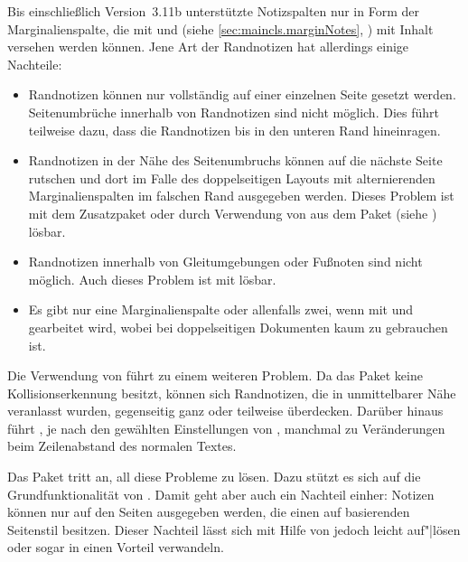 \BeginIndexGroup
{}%
Bis einschließlich Version~3.11b unterstützte \KOMAScript{} Notizspalten nur
in Form der Marginalienspalte, die mit  und
 (siehe \autoref{sec:maincls.marginNotes},
) mit Inhalt versehen werden
können. Jene Art der Randnotizen hat allerdings einige Nachteile:
\begin{itemize}
\item Randnotizen können nur vollständig auf einer einzelnen Seite gesetzt
  werden. Seitenumbrüche innerhalb von Randnotizen
  sind nicht möglich. Dies führt teilweise dazu, dass die Randnotizen bis in
  den unteren Rand hineinragen.
\item Randnotizen in der Nähe des Seitenumbruchs können auf die nächste Seite
  rutschen und dort im Falle des doppelseitigen Layouts mit alternierenden
  Marginalienspalten im falschen Rand
  ausgegeben werden. Dieses Problem ist mit dem Zusatzpaket
   oder durch Verwendung von
   aus dem Paket
   (siehe
  \cite{package:marginnote}) lösbar.
\item Randnotizen innerhalb von Gleitumgebungen oder
  Fußnoten sind nicht möglich. Auch dieses Problem ist mit
   lösbar.
\item Es gibt nur eine Marginalienspalte oder
  allenfalls zwei, wenn mit  und
   gearbeitet wird, wobei  bei
  doppelseitigen Dokumenten kaum zu gebrauchen ist.
\end{itemize}
Die Verwendung von  führt zu
einem weiteren Problem. Da das Paket keine Kollisionserkennung besitzt, können
sich Randnotizen, die in unmittelbarer Nähe veranlasst wurden, gegenseitig
ganz oder teilweise überdecken. Darüber hinaus führt , je
nach den gewählten Einstellungen von , manchmal zu
Veränderungen beim Zeilenabstand des normalen Textes.

Das Paket  tritt an, all diese Probleme zu
lösen. Dazu stützt es sich auf die Grundfunktionalität von
\hyperref[cha:scrlayer]{}%
. Damit geht aber
auch ein Nachteil einher: Notizen können nur auf den Seiten
ausgegeben werden, die einen auf \hyperref[cha:scrlayer]{}
basierenden Seitenstil besitzen. Dieser Nachteil lässt sich mit Hilfe von
\hyperref[cha:scrlayer-scrpage]{}%
%
 jedoch leicht auf"|lösen oder sogar in einen
Vorteil verwandeln.


